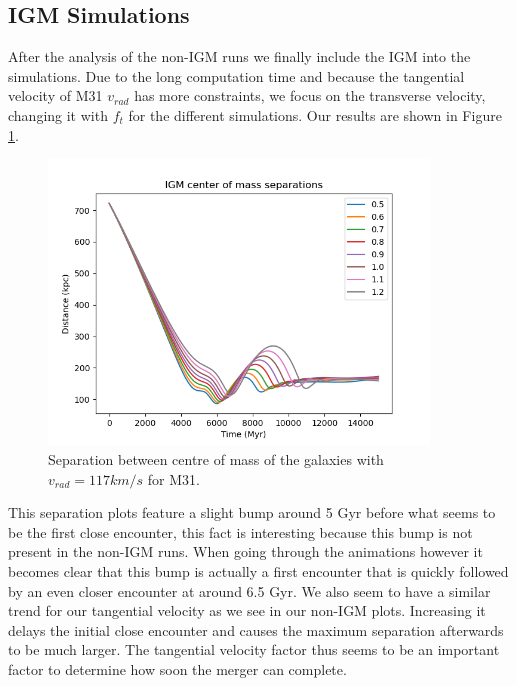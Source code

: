 \documentclass[a4paper,12pt, english]{article}
\begin{document}
\subsection{IGM Simulations}
\label{igm-simulations}
After the analysis of the non-IGM runs we finally include the IGM into the simulations. Due to the long computation time and because the tangential velocity of M31 $v_{rad}$ has more constraints, we focus on the transverse velocity, changing it with $f_t$ for the different simulations. Our results are shown in Figure \ref{fig:IGM-Separation}.\par
\begin{figure}[!h]
    \centering
    \includegraphics[width=0.9\textwidth]{separation/comparison_IGM_separation.png}
    \caption{Separation between centre of mass of the galaxies with $v_{rad}=117 km/s$ for M31.}
    \label{fig:IGM-Separation}
\end{figure}
\smallskip
This separation plots feature a slight bump around 5 Gyr before what seems to be the first close encounter, this fact is interesting because this bump is not present in the non-IGM runs. When going through the animations however it becomes clear that this bump is actually a first encounter that is quickly followed by an even closer encounter at around 6.5 Gyr. We also seem to have a similar trend for our tangential velocity as we see in our non-IGM plots. Increasing it delays the initial close encounter and causes the maximum separation afterwards to be much larger. The tangential velocity factor thus seems to be an important factor to determine how soon the merger can complete.\par
\newpage
\end{document}
